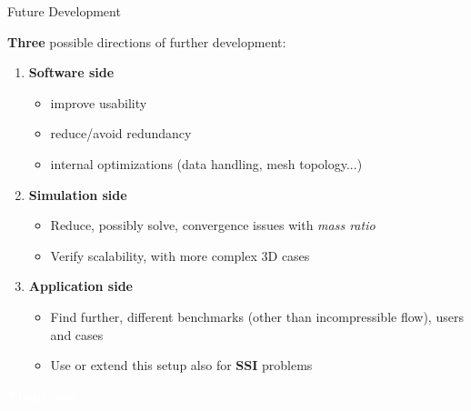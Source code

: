 \documentclass[10pt,t]{beamer}
\begin{document}
\begin{frame}{Future Development}

\textbf{Three} possible directions of further development:

\vspace{0.3cm}

\pause

\begin{enumerate}
    \item \textcolor{pblue}{\textbf{Software side}}
        \itemsep 10pt
        \begin{itemize}
            \item improve usability
            \item reduce/avoid redundancy
            \item internal optimizations (data handling, mesh topology...)
        \end{itemize}    

\pause
    
    \item \textcolor{pblue}{\textbf{Simulation side}}
    
        \begin{itemize}
            \item Reduce, possibly solve, convergence issues with \textit{mass ratio}
            \item Verify scalability, with more complex 3D cases
        \end{itemize}

\pause
    
    \item \textcolor{pblue}{\textbf{Application side}}
    
        \begin{itemize}
            \item Find further, different benchmarks (other than incompressible flow), users and cases
            \item Use or extend this setup also for \textbf{SSI} problems 
        \end{itemize}
    
\end{enumerate}


\end{frame}


\begin{frame}[c,plain]{}
    \centering
    \large{\textcolor{white}{\textbf{Thank you}}}
\end{frame}
\end{document}
